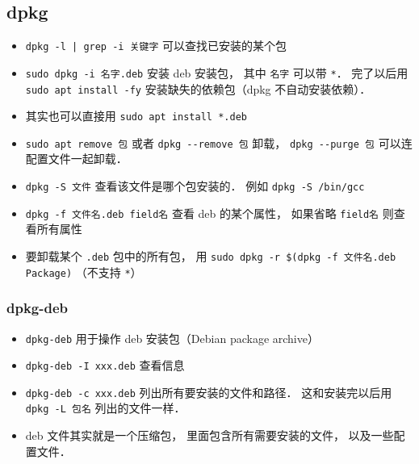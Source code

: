 \subsection{dpkg}
\begin{itemize}
\item \verb`dpkg -l | grep -i 关键字` 可以查找已安装的某个包
\item \verb|sudo dpkg -i 名字.deb| 安装 deb 安装包， 其中 \verb|名字| 可以带 \verb|*|． 完了以后用 \verb|sudo apt install -fy| 安装缺失的依赖包（dpkg 不自动安装依赖）．
\item 其实也可以直接用 \verb|sudo apt install *.deb|
\item \verb|sudo apt remove 包| 或者 \verb|dpkg --remove 包| 卸载， \verb|dpkg --purge 包| 可以连配置文件一起卸载．
\item \verb|dpkg -S 文件| 查看该文件是哪个包安装的． 例如 \verb|dpkg -S /bin/gcc|
\item \verb|dpkg -f 文件名.deb field名| 查看 deb 的某个属性， 如果省略 \verb|field名| 则查看所有属性
\item 要卸载某个 \verb|.deb| 包中的所有包， 用 \verb|sudo dpkg -r $(dpkg -f 文件名.deb Package)| （不支持 \verb|*|）
\end{itemize}

\subsubsection{dpkg-deb}
\begin{itemize}
\item \verb|dpkg-deb| 用于操作 deb 安装包（Debian package archive）
\item \verb|dpkg-deb -I xxx.deb| 查看信息
\item \verb|dpkg-deb -c xxx.deb| 列出所有要安装的文件和路径． 这和安装完以后用 \verb|dpkg -L 包名| 列出的文件一样．
\item deb 文件其实就是一个压缩包， 里面包含所有需要安装的文件， 以及一些配置文件．
\end{itemize}


